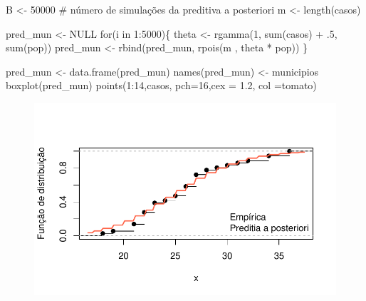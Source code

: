 \documentclass[
  letterpaper,
  DIV=11,
  numbers=noendperiod]{scrreprt}
\newenvironment{Shaded}{\begin{snugshade}}{\end{snugshade}}
\newcommand{\AttributeTok}[1]{\textcolor[rgb]{0.40,0.45,0.13}{#1}}
\newcommand{\CommentTok}[1]{\textcolor[rgb]{0.37,0.37,0.37}{#1}}
\newcommand{\ConstantTok}[1]{\textcolor[rgb]{0.56,0.35,0.01}{#1}}
\newcommand{\ControlFlowTok}[1]{\textcolor[rgb]{0.00,0.23,0.31}{#1}}
\newcommand{\DecValTok}[1]{\textcolor[rgb]{0.68,0.00,0.00}{#1}}
\newcommand{\FloatTok}[1]{\textcolor[rgb]{0.68,0.00,0.00}{#1}}
\newcommand{\FunctionTok}[1]{\textcolor[rgb]{0.28,0.35,0.67}{#1}}
\newcommand{\NormalTok}[1]{\textcolor[rgb]{0.00,0.23,0.31}{#1}}
\newcommand{\OtherTok}[1]{\textcolor[rgb]{0.00,0.23,0.31}{#1}}
\newcommand{\SpecialCharTok}[1]{\textcolor[rgb]{0.37,0.37,0.37}{#1}}
\newcommand{\StringTok}[1]{\textcolor[rgb]{0.13,0.47,0.30}{#1}}
\theoremstyle{definition}
\theoremstyle{definition}
\theoremstyle{remark}
\begin{document}
\begin{Shaded}
\begin{Highlighting}[]
\NormalTok{B }\OtherTok{\textless{}{-}} \DecValTok{50000} \CommentTok{\# número de simulações da preditiva a posteriori}
\NormalTok{m }\OtherTok{\textless{}{-}} \FunctionTok{length}\NormalTok{(casos)}

\NormalTok{pred\_mun }\OtherTok{\textless{}{-}} \ConstantTok{NULL}
\ControlFlowTok{for}\NormalTok{(i }\ControlFlowTok{in} \DecValTok{1}\SpecialCharTok{:}\DecValTok{5000}\NormalTok{)\{}
\NormalTok{  theta }\OtherTok{\textless{}{-}} \FunctionTok{rgamma}\NormalTok{(}\DecValTok{1}\NormalTok{, }\FunctionTok{sum}\NormalTok{(casos) }\SpecialCharTok{+}\NormalTok{ .}\DecValTok{5}\NormalTok{, }\FunctionTok{sum}\NormalTok{(pop))}
\NormalTok{  pred\_mun }\OtherTok{\textless{}{-}} \FunctionTok{rbind}\NormalTok{(pred\_mun, }\FunctionTok{rpois}\NormalTok{(m , theta }\SpecialCharTok{*}\NormalTok{ pop))}
\NormalTok{\}}

\NormalTok{pred\_mun }\OtherTok{\textless{}{-}} \FunctionTok{data.frame}\NormalTok{(pred\_mun)}
\FunctionTok{names}\NormalTok{(pred\_mun) }\OtherTok{\textless{}{-}}\NormalTok{ municipios}
\FunctionTok{boxplot}\NormalTok{(pred\_mun)}
\FunctionTok{points}\NormalTok{(}\DecValTok{1}\SpecialCharTok{:}\DecValTok{14}\NormalTok{,casos, }\AttributeTok{pch=}\DecValTok{16}\NormalTok{,}\AttributeTok{cex =} \FloatTok{1.2}\NormalTok{, }\AttributeTok{col =}\StringTok{\textquotesingle{}tomato\textquotesingle{}}\NormalTok{)}
\end{Highlighting}
\end{Shaded}

\begin{figure}[H]

{\centering \includegraphics{poisson_files/figure-pdf/unnamed-chunk-3-1.pdf}

}

\end{figure}
\end{document}
